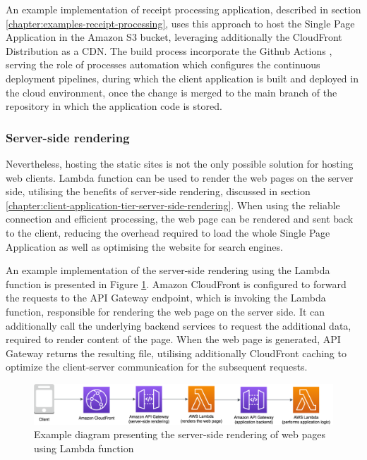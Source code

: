 An example implementation of receipt processing application, described in section \ref{chapter:examples-receipt-processing}, uses this approach to host the Single Page Application in the Amazon S3 bucket, leveraging additionally the CloudFront Distribution as a CDN.
The build process incorporate the Github Actions \cite{GithubAction}, serving the role of processes automation which configures the continuous deployment pipelines, during which the client application is built and deployed in the cloud environment, once the change is merged to the main branch of the repository in which the application code is stored.

\subsubsection{Server-side rendering}

Nevertheless, hosting the static sites is not the only possible solution for hosting web clients.
Lambda function can be used to render the web pages on the server side, utilising the benefits of server-side rendering, discussed in section \ref{chapter:client-application-tier-server-side-rendering}.
When using the reliable connection and efficient processing, the web page can be rendered and sent back to the client, reducing the overhead required to load the whole Single Page Application as well as optimising the website for search engines.

An example implementation of the server-side rendering using the Lambda function is presented in Figure \ref{fig:pattern-client-server-side-rendering}.
Amazon CloudFront is configured to forward the requests to the API Gateway endpoint, which is invoking the Lambda function, responsible for rendering the web page on the server side.
It can additionally call the underlying backend services to request the additional data, required to render content of the page.
When the web page is generated, API Gateway returns the resulting file, utilising additionally CloudFront caching to optimize the client-server communication for the subsequent requests.

\begin{figure}[H]
   \centering
   \includegraphics[width=1\textwidth]{assets/04-serverless-for-web-apps/serverSideRendering.png}
   \caption{Example diagram presenting the server-side rendering of web pages using Lambda function}
   \label{fig:pattern-client-server-side-rendering}
\end{figure}

